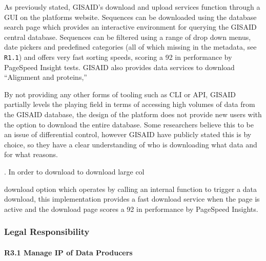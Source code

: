 \documentclass{article}
\begin{document}
As previously stated, GISAID's download and upload services function
through a GUI on the platforms website. Sequences can be downloaded
using the database search page which provides an interactive environment
for querying the GISAID central database. Sequences can be filtered
using a range of drop down menus, date pickers and predefined categories
(all of which missing in the metadata, see \texttt{R1.1}) and offers
very fast sorting speeds, scoring a 92 in performance by PageSpeed
Insight tests. GISAID also provides data services to download
``Alignment and proteins,''

By not providing any other forms of tooling such as CLI or API, GISAID
partially levels the playing field in terms of accessing high volumes of
data from the GISAID database, the design of the platform does not
provide new users with the option to download the entire database. Some
researchers believe this to be an issue of differential control, however
GISAID have publicly stated this is by choice, so they have a clear
understanding of who is downloading what data and for what reasons.

. In order to download to download large col

download option which operates by calling an internal function to
trigger a data download, this implementation provides a fast download
service when the page is active and the download page scores a 92 in
performance by PageSpeed Insights.

\hypertarget{legal-responsibility-1}{%
\subsubsection{Legal Responsibility}\label{legal-responsibility-1}}

\hypertarget{r3.1-manage-ip-of-data-producers}{%
\paragraph{R3.1 Manage IP of Data
Producers}\label{r3.1-manage-ip-of-data-producers}}
\end{document}
